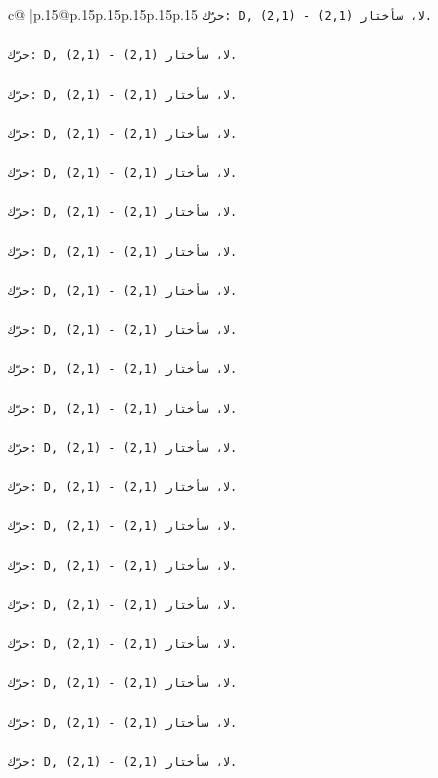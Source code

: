\documentclass{article}
\begin{document}
{\begin{supertabular}{c@{$\;$}|p{.15\linewidth}@{}p{.15\linewidth}p{.15\linewidth}p{.15\linewidth}p{.15\linewidth}p{.15\linewidth}}
{{{\texttt{حرّك: D, (2,1) {-} لا، سأختار (2,1).} \\
\\ 
\texttt{حرّك: D, (2,1) {-} لا، سأختار (2,1).} \\
\\ 
\texttt{حرّك: D, (2,1) {-} لا، سأختار (2,1).} \\
\\ 
\texttt{حرّك: D, (2,1) {-} لا، سأختار (2,1).} \\
\\ 
\texttt{حرّك: D, (2,1) {-} لا، سأختار (2,1).} \\
\\ 
\texttt{حرّك: D, (2,1) {-} لا، سأختار (2,1).} \\
\\ 
\texttt{حرّك: D, (2,1) {-} لا، سأختار (2,1).} \\
\\ 
\texttt{حرّك: D, (2,1) {-} لا، سأختار (2,1).} \\
\\ 
\texttt{حرّك: D, (2,1) {-} لا، سأختار (2,1).} \\
\\ 
\texttt{حرّك: D, (2,1) {-} لا، سأختار (2,1).} \\
\\ 
\texttt{حرّك: D, (2,1) {-} لا، سأختار (2,1).} \\
\\ 
\texttt{حرّك: D, (2,1) {-} لا، سأختار (2,1).} \\
\\ 
\texttt{حرّك: D, (2,1) {-} لا، سأختار (2,1).} \\
\\ 
\texttt{حرّك: D, (2,1) {-} لا، سأختار (2,1).} \\
\\ 
\texttt{حرّك: D, (2,1) {-} لا، سأختار (2,1).} \\
\\ 
\texttt{حرّك: D, (2,1) {-} لا، سأختار (2,1).} \\
\\ 
\texttt{حرّك: D, (2,1) {-} لا، سأختار (2,1).} \\
\\ 
\texttt{حرّك: D, (2,1) {-} لا، سأختار (2,1).} \\
\\ 
\texttt{حرّك: D, (2,1) {-} لا، سأختار (2,1).} \\
\\ 
\texttt{حرّك: D, (2,1) {-} لا، سأختار (2,1).} \\
}}}
\end{supertabular}}
\end{document}
